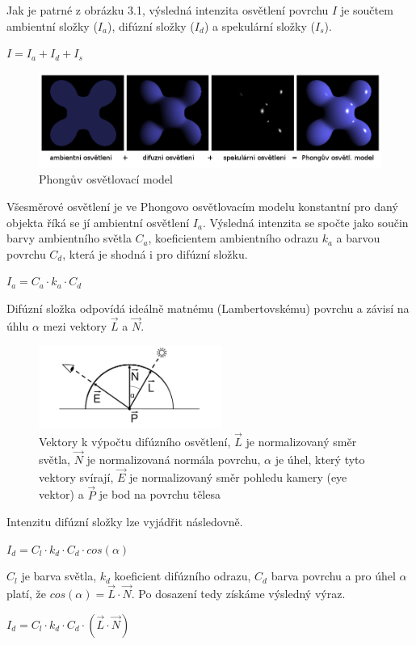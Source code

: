 \documentclass[11pt,twoside,a4paper]{book}
\begin{document}
Jak je patrné z obrázku 3.1, výsledná intenzita osvětlení povrchu $I$ je součtem ambientní složky ($I_a$), difúzní složky ($I_d$) a spekulární složky ($I_s$).
\begin{center}
$I = I_a + I_d + I_s$
\end{center}

\begin{center}
\begin{figure}[h!]
\includegraphics[width=150mm]{figures/phong.png}
\caption{Phongův osvětlovací model}
\end{figure}
\end{center}

Všesměrové osvětlení je ve Phongovo osvětlovacím modelu konstantní pro daný objekt\linebreak a říká se jí ambientní osvětlení $I_a$. Výsledná intenzita se spočte jako součin barvy ambientního světla $C_a$, koeficientem ambientního odrazu $k_a$ a barvou povrchu $C_d$, která je shodná i pro difúzní složku.
\begin{center}
$I_a = C_a \cdot k_a \cdot C_d$
\end{center}

Difúzní složka odpovídá ideálně matnému (Lambertovskému) povrchu a závisí na úhlu $\alpha$ mezi vektory $\vec{L}$ a $\vec{N}$.
\begin{center}
\begin{figure}[h!]
\includegraphics[width=60mm]{figures/phongD.png}
\caption{Vektory k výpočtu difúzního osvětlení, $\vec{L}$ je normalizovaný směr světla, $\vec{N}$ je normalizovaná normála povrchu, $\alpha$ je úhel, který tyto vektory svírají, $\vec{E}$ je normalizovaný směr pohledu kamery (eye vektor) a $\vec{P}$ je bod na povrchu tělesa}
\end{figure}
\end{center}
Intenzitu difúzní složky lze vyjádřit následovně.
\begin{center}
$I_d = C_l \cdot k_d \cdot C_d \cdot cos(\alpha)$
\end{center}
$C_l$ je barva světla, $k_d$ koeficient difúzního odrazu, $C_d$ barva povrchu a pro úhel $\alpha$ platí, že $cos(\alpha) = \vec{L} \cdot \vec{N}$. Po dosazení tedy získáme výsledný výraz.
\begin{center}
$I_d = C_l \cdot k_d \cdot C_d \cdot (\vec{L} \cdot \vec{N})$
\end{center}
\bigskip
\end{document}
